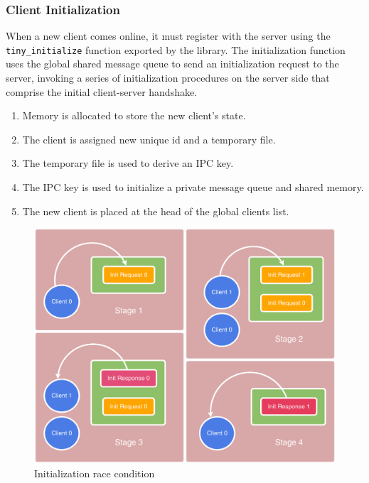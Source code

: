\documentclass[paper=a4, fontsize=11pt]{scrartcl} %
\numberwithin{equation}{section} %
\numberwithin{figure}{section} %
\numberwithin{table}{section} %
\begin{document}
\subsubsection{Client Initialization}
When a new client comes online, it must register with the server using the \texttt{tiny\_initialize} function exported by the library. The initialization function uses the global shared message queue to send an initialization request to the server, invoking a series of initialization procedures on the server side that comprise the initial client-server handshake.
\begin{enumerate}
\item Memory is allocated to store the new client's state.
\item The client is assigned new unique id and a temporary file.
\item The temporary file is used to derive an IPC key.
\item The IPC key is used to initialize a private message queue and shared memory.
\item The new client is placed at the head of the global clients list.
\end{enumerate}

\begin{figure}
  \includegraphics[width=\linewidth]{img/init.png}
  \caption{Initialization race condition}
\end{figure}
\end{document}
